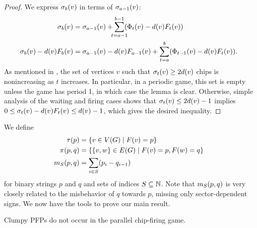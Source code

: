 \begin{proof}
We express $\chips{v}{b}$ in terms of $\chips{v}{a-1}$:
\begin{align*}
  \chips{v}{b} &= \chips{v}{a-1} +
  \smashoperator{\sum_{t=a-1}}^{b-1}(\receiving{v}{t} - \deg{v}\firing{v}{t})
  \\
  \chips{v}{b} - \deg{v}\firing{v}{b} &= \chips{v}{a-1} -
  \deg{v}\firing{v}{a-1} + \sum_{t=a}^{b}(\receiving{v}{t-1} -
  \deg{v}\firing{v}{t}).
\end{align*}
As mentioned in \cite[Section 2]{kominers}, the set of vertices $v$ such that
$\chips{v}{t} \geq 2\deg{v}$ chips is nonincreasing as $t$ increases. In
particular, in a periodic game, this set is empty unless the game has period 1,
in which case the lemma is clear. Otherwise, simple analysis of the waiting and
firing cases shows that $\chips{v}{t} \leq 2\deg{v} - 1$ implies $0 \leq
\chips{v}{t} - \deg{v}\firing{v}{t} \leq \deg{v} - 1$, which gives the desired
inequality.
\end{proof}

We define
\begin{align*}
\pfpverts{p} &= {\set{v \in \V}{\pfp{v}=p}} \\
\pfpedges{p}{q} &= {\set{\{v,w\} \in \E}{\pfp{v}=p, \pfp{w} = q}} \\
\misb{S}{p}{q} &= \sum_{i \in S}(p_{i} - q_{i-1})
\end{align*}
for binary strings $p$ and $q$ and sets of indices $S \subseteq \nats$. Note
that $\misb{S}{p}{q}$ is very closely related to the misbehavior of $q$ towards
$p$, missing only sector-dependent signs. We now have the tools to prove our
main result.

\begin{thm}\label{nct}
Clumpy PFPs do not occur in the parallel chip-firing game.
\end{thm}

